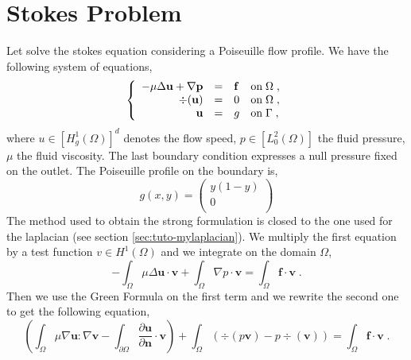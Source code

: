 %

\section{Stokes Problem}
\label{sec:tuto-mystokes}

Let solve the stokes equation considering a Poiseuille flow profile. 
We have the following system of equations,
%
\begin{equation}
\left\{
\begin{array}{rcll}
-\mu\Delta \bf u + \nabla p & = & \bf f & \text{on}\; \Omega \;, \\
                \div(\bf u) & = & 0 & \text{on}\; \Omega \;, \\
                \bf u  & = & g & \text{on}\; \Gamma \;, \\
\end{array}
\right.
\label{eq:tuto-stk}
\end{equation}
%
where $u\in [H_g^1(\Omega)]^d$ denotes the flow speed, $p\in [L_0^2(\Omega)]$ the fluid pressure, $\mu$ the 
fluid viscosity.
The last boundary condition expresses a null pressure fixed
on the outlet. The Poiseuille profile on the boundary is,
%
\begin{equation}
g(x,y)=
\left(
\begin{array}{c}
 y(1-y) \\
 0      \\
\end{array}
\right)
\end{equation}
%
The method used to obtain the strong formulation is closed to the one used
for the laplacian (see section \ref{sec:tuto-mylaplacian}).
We multiply the first equation by a test function $v\in H^1(\Omega)$
and we integrate on the domain $\Omega$,
%
\begin{equation}
-\int_\Omega \mu \Delta \mathbf u \cdot \mathbf v
+\int_\Omega \nabla p \cdot \mathbf v
=\int_\Omega \mathbf f \cdot \mathbf v \;.
\end{equation}
%
Then we use the Green Formula on the first term and we rewrite the second one 
to get the following equation,
%
\begin{equation}
\left(
\int_\Omega \mu \nabla \mathbf u : \nabla \mathbf v
-\int_{\partial\Omega} \frac{\partial \mathbf u}{\partial \mathbf n} \cdot \mathbf v
\right)
+\int_\Omega ( \div(p \mathbf v) - p\div(\mathbf v ) )
=\int_\Omega \mathbf f \cdot \mathbf v \;.
\label{eq:tuto-stk-1}
\end{equation}
